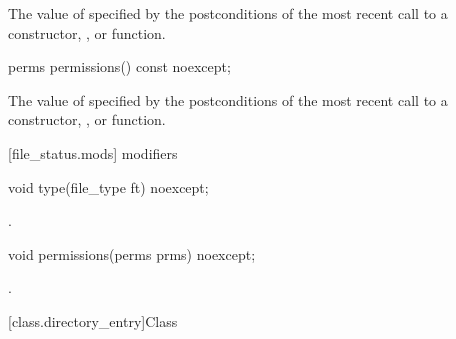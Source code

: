\begin{itemdescr}
\pnum
\returns The value of  specified by the postconditions of the most recent call to a constructor,
  , or  function.
\end{itemdescr}

%
\begin{itemdecl}
perms permissions() const noexcept;
\end{itemdecl}

\begin{itemdescr}
\pnum
\returns The value of  specified by the postconditions of the most recent call to a constructor,
  , or  function.
\end{itemdescr}

[file_status.mods]{ modifiers}

%
\begin{itemdecl}
void type(file_type ft) noexcept;
\end{itemdecl}

\begin{itemdescr}
\pnum
\postconditions {}.
\end{itemdescr}

%
\begin{itemdecl}
void permissions(perms prms) noexcept;
\end{itemdecl}

\begin{itemdescr}
\pnum
\postconditions {}.
\end{itemdescr}

[class.directory_entry]{Class }

